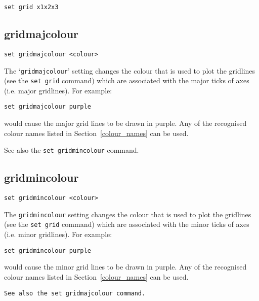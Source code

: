 \begin{verbatim}
set grid x1x2x3
\end{verbatim}


\subsection{gridmajcolour}

\begin{verbatim}
set gridmajcolour <colour>
\end{verbatim}

The `{\tt gridmajcolour}' setting changes the colour that is used to plot the
gridlines (see the {\tt set grid} command) which are associated with the major
ticks of axes (i.e. major gridlines). For example:

\begin{verbatim}
set gridmajcolour purple
\end{verbatim}

\noindent would cause the major grid lines to be drawn in purple. Any of the recognised
colour names listed in Section~\ref{colour_names} can be used.

See also the {\tt set gridmincolour} command.


\subsection{gridmincolour}

\begin{verbatim}
set gridmincolour <colour>
\end{verbatim}

The {\tt gridmincolour} setting changes the colour that is used to plot the
gridlines (see the {\tt set grid} command) which are associated with the minor
ticks of axes (i.e. minor gridlines). For example:

\begin{verbatim}
set gridmincolour purple
\end{verbatim}

\noindent would cause the minor grid lines to be drawn in purple. Any of the recognised
colour names listed in Section~\ref{colour_names} can be used.

\begin{verbatim}
See also the set gridmajcolour command.
\end{verbatim}


